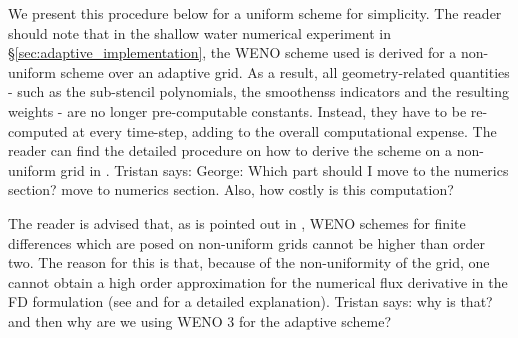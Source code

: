 \documentclass[final]{amsart}
\newcommand{\tristan}[1]{{\color{purple} Tristan says:  #1 }}
\numberwithin{equation}{section}
\begin{document}
We present this procedure below for a uniform scheme for simplicity.
The reader should note that in the shallow water numerical experiment
in \S\ref{sec:adaptive_implementation}, the WENO scheme used is
derived for a non-uniform scheme over an adaptive grid.  As a result,
all geometry-related quantities - such as the sub-stencil polynomials,
the smoothenss indicators and the resulting weights - are no longer
pre-computable constants.  Instead, they have to be re-computed at
every time-step, adding to the overall computational expense.  The reader can find the detailed procedure on how to
derive the scheme on a non-uniform grid in \cite{shu1998essentially}.
\tristan{George: Which part should I move to the numerics section? move to numerics section. Also, how costly is this computation?}

\begin{Rem}
  The reader is advised that, as is pointed out in
  \cite{shu1998essentially}, WENO schemes for finite differences which
  are posed on non-uniform grids cannot be higher than order
  two. The reason for this is that, because of the non-uniformity of the grid, one cannot obtain a high order approximation for the numerical flux derivative in the FD formulation (see \cite[Problem 22]{shu1988efficient} and \cite[\S11.4]{hesthaven2017numerical} for a detailed explanation). \tristan{why is that? and then why are we using WENO 3 for the
    adaptive scheme?}
\end{Rem}
\end{document}
